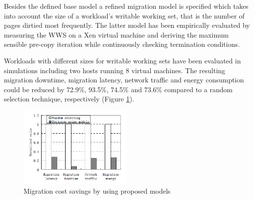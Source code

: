 Besides the defined base model a refined migration model is specified which takes into account the size of a workload's writable working set, that is the number of pages dirtied most frequently. The latter model has been empirically evaluated by measuring the WWS on a Xen virtual machine and deriving the maximum sensible pre-copy iteration while continuously checking termination conditions. 

Workloads with different sizes for writable working sets have been evaluated in simulations including two hosts running 8 virtual machines. 
The resulting migration downtime, migration latency, network traffic and energy consumption could be reduced by 72.9\%, 93.5\%, 74.5\% and 73.6\% compared to a random selection technique, respectively (Figure \ref{fig:vm_migration_normalized_cost}). 

\begin{figure}[htbp]
	\centering
		\includegraphics[width=0.5\textwidth]{figures/state_of_the_art/vm_migration_normalized_cost.PNG}
	\caption{Migration cost savings by using proposed models \cite{liu2013performance}}
	\label{fig:vm_migration_normalized_cost}
\end{figure}














%


